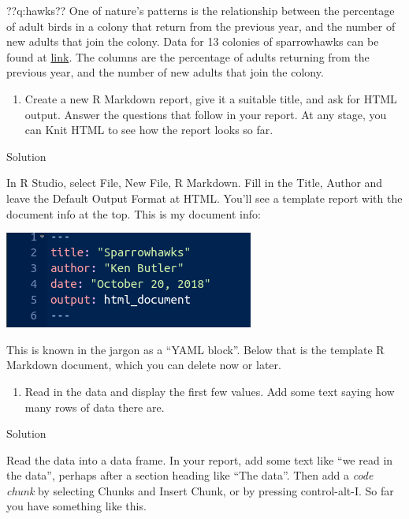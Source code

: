 \documentclass[]{tufte-book}
\providecommand{\tightlist}{%
  \setlength{\itemsep}{0pt}\setlength{\parskip}{0pt}}
\theoremstyle{definition}
\theoremstyle{definition}
\theoremstyle{definition}
\theoremstyle{remark}
\begin{document}
??q:hawks?? One of nature's patterns is the relationship between the
percentage of adult birds in a colony that return from the previous
year, and the number of new adults that join the colony. Data for 13
colonies of sparrowhawks can be found at
\href{http://www.utsc.utoronto.ca/~butler/c32/sparrowhawk.txt}{link}.
The columns are the percentage of adults returning from the previous
year, and the number of new adults that join the colony.

\begin{enumerate}
\def\labelenumi{(\alph{enumi})}
\tightlist
\item
  Create a new R Markdown report, give it a suitable title, and ask for
  HTML output. Answer the questions that follow in your report. At any
  stage, you can Knit HTML to see how the report looks so far.
\end{enumerate}

Solution

In R Studio, select File, New File, R Markdown. Fill in the Title,
Author and leave the Default Output Format at HTML. You'll see a
template report with the document info at the top. This is my document
info:

\includegraphics{sh0.png}

This is known in the jargon as a ``YAML block''.
Below that is the template R Markdown document, which you can delete now
or later.

\begin{enumerate}
\def\labelenumi{(\alph{enumi})}
\setcounter{enumi}{1}
\tightlist
\item
  Read in the data and display the first few values. Add some text
  saying how many rows of data there are.
\end{enumerate}

Solution

Read the data into a data frame. In your report, add some text like ``we
read in the data'', perhaps after a section heading like ``The data''.
Then add a \emph{code chunk} by selecting Chunks and Insert Chunk, or by
pressing control-alt-I. So far you have something like this.
\end{document}

